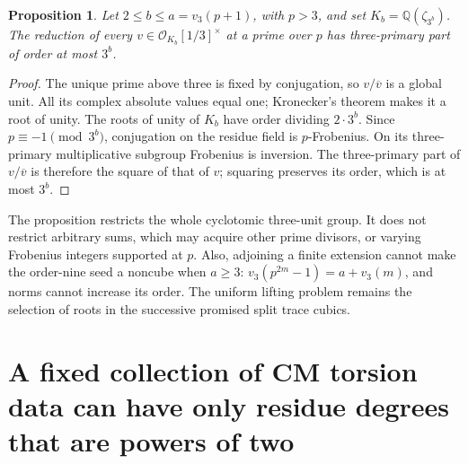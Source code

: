 \documentclass[11pt]{article}
\newtheorem{proposition}[theorem]{Proposition}
\theoremstyle{definition}
\theoremstyle{remark}
\begin{document}
\begin{proposition}\label{prop:kummer-cyclotomic-three-unit-bound}
Let \(2\le b\le a=v_3(p+1)\), with \(p>3\), and set
\(K_b=\mathbb Q(\zeta_{3^b})\). The reduction of every
\(v\in\mathcal O_{K_b}[1/3]^\times\) at a prime over
\(p\) has three-primary part of order at most \(3^b\).
\end{proposition}
\begin{proof}
The unique prime above three is fixed by conjugation, so
\(v/\overline v\) is a global unit. All its complex
absolute values equal one; Kronecker's theorem makes it a
root of unity. The roots of unity of \(K_b\) have order
dividing \(2\cdot3^b\). Since \(p\equiv-1\pmod{3^b}\),
conjugation on the residue field is \(p\)-Frobenius. On
its three-primary multiplicative subgroup Frobenius is
inversion. The three-primary part of \(v/\overline v\)
is therefore the square of that of \(v\); squaring preserves
its order, which is at most \(3^b\).
\end{proof}

The proposition restricts the whole cyclotomic three-unit group.
It does not restrict arbitrary sums, which may acquire other
prime divisors, or varying Frobenius integers supported at \(p\).
Also, adjoining a finite extension cannot make the order-nine
seed a noncube when \(a\ge3\):
\(v_3(p^{2m}-1)=a+v_3(m)\), and norms cannot increase its
order. The uniform lifting problem remains the selection of
roots in the successive promised split trace cubics.

\section{A fixed collection of CM torsion data can have only residue degrees that are powers of two}
\label{sec:kummer-fixed-cm-data}
\end{document}
